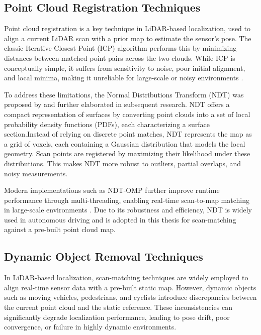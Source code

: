 \subsection{Point Cloud Registration Techniques}
Point cloud registration is a key technique in LiDAR-based localization, used to align a current LiDAR scan with a prior map to estimate the sensor’s pose. The classic Iterative Closest Point (ICP) algorithm performs this by minimizing distances between matched point pairs across the two clouds. While ICP is conceptually simple, it suffers from sensitivity to noise, poor initial alignment, and local minima, making it unreliable for large-scale or noisy environments \cite{BeslICP1992}.

To address these limitations, the Normal Distributions Transform (NDT) was proposed by \cite{biber2003ndt} and
further elaborated in subsequent research\cite{magnusson2007ndt}.  NDT offers a compact representation
of surfaces by converting point clouds into a set of local probability density functions
(PDFs), each characterizing a surface section.Instead of relying on discrete point matches, NDT represents the map as a grid of voxels, each containing a Gaussian distribution that models the local geometry. Scan points are registered by maximizing their likelihood under these distributions. This makes NDT more robust to outliers, partial overlaps, and noisy measurements.

Modern implementations such as NDT-OMP further improve runtime performance through multi-threading, enabling real-time scan-to-map matching in large-scale environments \cite{koide2019portable}. Due to its robustness and efficiency, NDT is widely used in autonomous driving and is adopted in this thesis for scan-matching against a pre-built point cloud map.

\subsection{Dynamic Object Removal Techniques}

In LiDAR-based localization, scan-matching techniques are widely employed to align real-time sensor data with a pre-built static map. However, dynamic objects such as moving vehicles, pedestrians, and cyclists introduce discrepancies between the current point cloud and the static reference. These inconsistencies can significantly degrade localization performance, leading to pose drift, poor convergence, or failure in highly dynamic environments.

